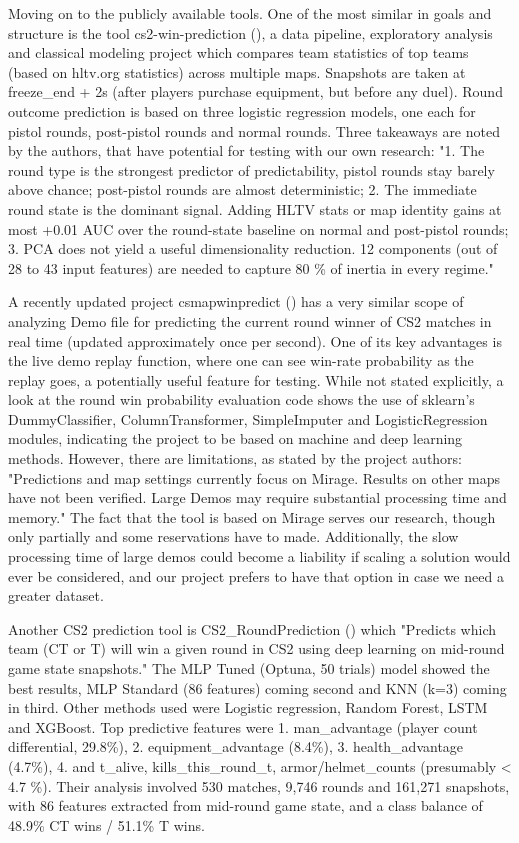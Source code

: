 \documentclass[twoside,11pt]{article}
\begin{document}
Moving on to the publicly available tools. One of the most similar in goals and structure is the
tool cs2-win-prediction (\cite{cs2winprediction}), a data pipeline, exploratory analysis and
classical modeling project which compares team statistics of top teams (based on hltv.org
statistics) across multiple maps. Snapshots are taken at freeze\_end + 2s (after players purchase
equipment, but before any duel). Round outcome prediction is based on three logistic regression
models, one each for pistol rounds, post-pistol rounds and normal rounds. Three takeaways are noted
by the authors, that have potential for testing with our own research: "1. The round type is the
strongest predictor of predictability, pistol rounds stay barely above chance; post-pistol rounds
are almost deterministic; 2. The immediate round state is the dominant signal. Adding HLTV stats or
map identity gains at most +0.01 AUC over the round-state baseline on normal and post-pistol rounds;
3. PCA does not yield a useful dimensionality reduction. 12 components (out of 28 to 43 input
features) are needed to capture 80 \% of inertia in every regime."

A recently updated project csmapwinpredict (\cite{csmapwinpredict}) has a very similar scope of
analyzing Demo file for predicting the current round winner of CS2 matches in real time (updated
approximately once per second). One of its key advantages is the live demo replay function, where
one can see win-rate probability as the replay goes, a potentially useful feature for testing. While
not stated explicitly, a look at the round win probability evaluation code shows the use of
sklearn's DummyClassifier, ColumnTransformer, SimpleImputer and LogisticRegression modules,
indicating the project to be based on machine and deep learning methods. However, there are
limitations, as stated by the project authors: "Predictions and map settings currently focus on
Mirage. Results on other maps have not been verified. Large Demos may require substantial processing
time and memory." The fact that the tool is based on Mirage serves our research, though only
partially and some reservations have to made. Additionally, the slow processing time of large demos
could become a liability if scaling a solution would ever be considered, and our project prefers to
have that option in case we need a greater dataset.

Another CS2 prediction tool is CS2\_RoundPrediction (\cite{cs2roundprediction}) which "Predicts
which team (CT or T) will win a given round in CS2 using deep learning on mid-round game state
snapshots." The MLP Tuned (Optuna, 50 trials) model showed the best results, MLP Standard (86
features) coming second and KNN (k=3) coming in third. Other methods used were Logistic regression,
Random Forest, LSTM and XGBoost. Top predictive features were 1. man\_advantage (player count
differential, 29.8\%), 2. equipment\_advantage (8.4\%), 3. health\_advantage (4.7\%), 4. and
t\_alive, kills\_this\_round\_t, armor/helmet\_counts (presumably < 4.7 \%). Their analysis involved
530 matches, 9,746 rounds and 161,271 snapshots, with 86 features extracted from mid-round game
state, and a class balance of 48.9\% CT wins / 51.1\% T wins.
\end{document}
